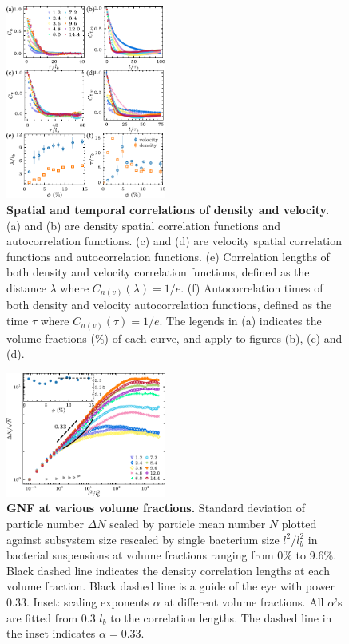 \documentclass[twocolumn,aps,prx,amsmath,amssymb,longbibliography]{revtex4-2}
\begin{document}
\begin{figure}[ht]
\begin{center}
\includegraphics[width=0.47\textwidth]{figures/spatiotemporal-correlations/v5.pdf}
\caption[spatiotemporal-correlations.]
{
\textbf{Spatial and temporal correlations of density and velocity.}
(a) and (b) are density spatial correlation functions and autocorrelation functions.
(c) and (d) are velocity spatial correlation functions and autocorrelation functions.
(e) Correlation lengths of both density and velocity correlation functions, defined as the distance $\lambda$ where $C_{n(v)}(\lambda)=1/e$.
(f) Autocorrelation times of both density and velocity autocorrelation functions, defined as the time $\tau$ where $C_{n(v)}(\tau)=1/e$.
The legends in (a) indicates the volume fractions (\%) of each curve, and apply to figures (b), (c) and (d).
}
\label{fig:spatiotemporal-correlations}
\end{center}
\end{figure}

\begin{figure}[ht]
\begin{center}
\includegraphics[width=0.47\textwidth]{figures/GNF/v4.pdf}
\caption[Concentration dependence of GNF.]
{
\textbf{GNF at various volume fractions.}
Standard deviation of particle number $\Delta N$ scaled by particle mean number $N$ plotted against subsystem size rescaled by single bacterium size $l^2/l_b^2$ in bacterial suspensions at volume fractions ranging from 0\% to 9.6\%. Black dashed line indicates the density correlation lengths at each volume fraction. Black dashed line is a guide of the eye with power 0.33. Inset: scaling exponents $\alpha$ at different volume fractions. All $\alpha$'s are fitted from 0.3 $l_b$ to the correlation lengths. The dashed line in the inset indicates $\alpha=0.33$.
}
\label{fig:GNF}
\end{center}
\end{figure}
\end{document}
